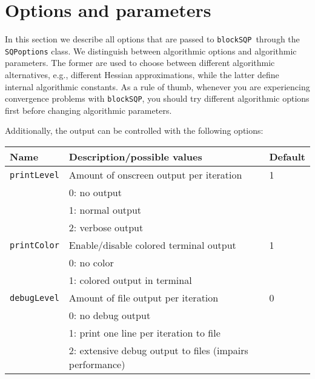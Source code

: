 \documentclass[	11pt,
				a4paper,
				abstract=true,
				twoside=true,
				bibliography=totoc, 
				headinclude=true,
				footinclude=false]{scrartcl}
\newcommand{\blockSQP}{\texttt{blockSQP}}
\begin{document}
\section{Options and parameters}
In this section we describe all options that are passed to \blockSQP\ through the \texttt{SQPoptions} class.
We distinguish between algorithmic options and algorithmic parameters. The former are used to choose between different algorithmic alternatives, e.g., different Hessian approximations, while the latter define internal algorithmic constants. As a rule of thumb, whenever you are experiencing convergence problems with \blockSQP, you should try different algorithmic options first before changing algorithmic parameters.

Additionally, the output can be controlled with the following options:
\begin{longtable}[c]{lll}
Name 							& Description/possible values									& Default	\\\hline\hline
%
\texttt{printLevel}				& Amount of onscreen output per iteration						& 1			\\
								& 0: no output													&			\\
								& 1: normal output												&			\\
								& 2: verbose output												&			\\\hline
%								
\texttt{printColor}				& Enable/disable colored terminal output						& 1			\\
								& 0: no color													&			\\
								& 1: colored output in terminal									&			\\\hline
%
\texttt{debugLevel}				& Amount of file output per iteration							& 0			\\
								& 0: no debug output											& 			\\
								& 1: print one line per iteration to file 						& 			\\
								& 2: extensive debug output to files (impairs performance)		& 			\\\hline
\end{longtable}

\end{document}
